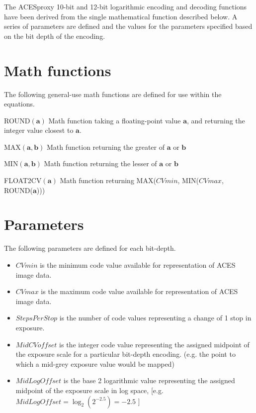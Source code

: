 \label{appendixD}

The ACESproxy 10-bit and 12-bit logarithmic encoding and decoding functions have been derived from the single mathematical function described below. A series of parameters are defined and the values for the parameters specified based on the bit depth of the encoding.

\unnumberedformat
\section{Math functions}
The following general-use math functions are defined for use within the equations.

ROUND$(\mathbf{a})$ \tabto{7em}Math function taking a floating-point value $\mathbf{a}$, and returning the integer value closest to $\mathbf{a}$.

MAX$(\mathbf{a,b})$ \tabto{7em}Math function returning the greater of $\mathbf{a}$ or $\mathbf{b}$

MIN$(\mathbf{a,b})$ \tabto{7em}Math function returning the lesser of $\mathbf{a}$ or $\mathbf{b}$

FLOAT2CV$(\mathbf{a})$ \tabto{7em}Math function returning MAX($CVmin$, MIN($CVmax$, ROUND($\mathbf{a}$)))

\section{Parameters}
The following parameters are defined for each bit-depth.

\begin{itemize}
	\item $CVmin$ is the minimum code value available for representation of ACES image data.
	\item $CVmax$ is the maximum code value available for representation of ACES image data.
	\item $StepsPerStop$ is the number of code values representing a change of 1 stop in exposure.
	\item $MidCVoffset$ is the integer code value representing the assigned midpoint of the exposure scale for a particular bit-depth encoding. (e.g. the point to which a mid-grey exposure value would be mapped)
	\item $MidLogOffset$ is the base 2 logarithmic value representing the assigned midpoint of the exposure scale in log space, [e.g. $MidLogOffset = \log_2( 2^{-2.5} ) = -2.5$ ]
\end{itemize}

